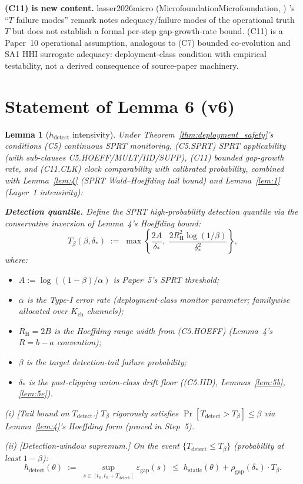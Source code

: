 \documentclass{article}
\makeatletter
\newcommand{\citep}[2][]{%
  \begingroup
  \def\@tmpkey{#2}%
  \ifx\@tmpkey\@empty\else
    (\ifx\@empty#1\@empty\else #1, \fi
     \@nameuse{bibkey@\@tmpkey})%
  \fi
  \endgroup
}
\newtheorem{lemma}{Lemma}
\newcommand{\deltastar}{\delta_{*}}
\newcommand{\rhogap}{\rho_{\mathrm{gap}}}
\newcommand{\epsgap}{\varepsilon_{\mathrm{gap}}}
\newcommand{\Tbeta}{T_{\beta}}
\newcommand{\Bclip}{B}
\newcommand{\Rh}{R_{\mathrm{H}}}
\newcommand{\Kch}{K_{\mathrm{ch}}}
\makeatother
\begin{document}
\textbf{(C11) is new content.}  \citep[Microfoundation]{lasser2026micro}'s
``$T$ failure modes'' remark notes adequacy/failure modes of the
operational truth $T$ but does not establish a formal per-step
gap-growth-rate bound.  (C11) is a Paper~10 operational assumption,
analogous to (C7) bounded co-evolution and SA1 HHI surrogate
adequacy: deployment-class condition with empirical testability,
not a derived consequence of source-paper machinery.

\section{Statement of Lemma 6 (v6)}

\begin{lemma}[$h_{\mathrm{detect}}$ intensivity]
\label{lem:6}
Under Theorem~\ref{thm:deployment_safety}'s conditions (C5)
continuous SPRT monitoring, (C5.SPRT) SPRT applicability (with
sub-clauses C5.HOEFF/MULT/IID/SUPP), (C11) bounded gap-growth
rate, and (C11.CLK) clock comparability with calibrated
probability, combined with Lemma~\ref{lem:4} (SPRT Wald--Hoeffding
tail bound) and Lemma~\ref{lem:1} (Layer~1 intensivity):

\textbf{Detection quantile.}  Define the SPRT high-probability
detection quantile via the conservative inversion of Lemma~4's
Hoeffding bound:
\[
  \Tbeta(\beta, \deltastar) \;:=\;
  \max\!\left\{\frac{2A}{\deltastar},\;
  \frac{2 \Rh^2 \log(1/\beta)}{\deltastar^2}\right\},
\]
where:
\begin{itemize}
\item $A := \log((1-\beta)/\alpha)$ is Paper~5's SPRT threshold;
\item $\alpha$ is the Type-I error rate (deployment-class monitor
  parameter; familywise allocated over $\Kch$ channels);
\item $\Rh = 2\Bclip$ is the Hoeffding range width from
  (C5.HOEFF) (Lemma~4's $R = b - a$ convention);
\item $\beta$ is the target detection-tail failure probability;
\item $\deltastar$ is the post-clipping union-class drift floor
  ((C5.IID), Lemmas~\ref{lem:5b}, \ref{lem:5e}).
\end{itemize}

(i) [Tail bound on $T_{\mathrm{detect}}$.]  $\Tbeta$ rigorously
satisfies $\Pr[T_{\mathrm{detect}} > \Tbeta] \leq \beta$ via
Lemma~\ref{lem:4}'s Hoeffding form (proved in Step~5).

(ii) [Detection-window supremum.]  On the event
$\{T_{\mathrm{detect}} \leq \Tbeta\}$ (probability at least
$1-\beta$):
\[
  h_{\mathrm{detect}}(\theta) \;:=\;
  \sup_{s \in [t_0, t_0 + T_{\mathrm{detect}}]} \epsgap(s)
  \;\leq\; h_{\mathrm{static}}(\theta) + \rhogap(\deltastar) \cdot
  \Tbeta.
\]


\end{lemma}
\end{document}
